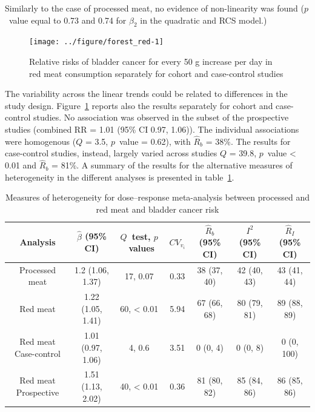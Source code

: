 \documentclass[11pt,a4paper,twoside,openany]{book}\usepackage{knitr}
\begin{document}
{\noindent Similarly to the case of processed meat, no evidence of non-linearity was found ($p$~value equal to 0.73 and 0.74 for $\beta_2$ in the quadratic and RCS model.)

\begin{knitrout}\footnotesize
{}\color{fgcolor}\begin{figure}[ht!]

{\centering \texttt{[image: ../figure/forest\_red-1]} 

}

\caption[Relative risks of bladder cancer for every 50 g increase per day in red meat consumption separately for cohort and case-control studies]{Relative risks of bladder cancer for every 50 g increase per day in red meat consumption separately for cohort and case-control studies}\label{fig:forest_red}
\end{figure}


\end{knitrout}

The variability across the linear trends could be related to differences in the study design. Figure~\ref{fig:forest_red} reports also the results separately for cohort and case-control studies. No association was observed in the subset of the prospective studies (combined RR = 1.01 (95\% CI 0.97, 1.06)). The individual associations were homogenous ($Q $ = 3.5, $p$~value = 0.62), with $\hat R_b$ = 38\%. The results for case-control studies, instead, largely varied across studies $Q $ = 39.8, $p$~value < 0.01 and $\hat R_b$ = 81\%. A summary of the results for the alternative measures of heterogeneity in the different analyses is presented in table~\ref{tab:tab_rb}.

\begin{table}[!h]

\caption{\label{tab:tab_rb}Measures of heterogeneity for dose--response meta-analysis between processed and red meat and bladder cancer risk \citep{crippa2016red}}
\centering
\fontsize{9}{11}\selectfont
\begin{tabular}[t]{ccccccc}
\toprule
Analysis & $\hat \beta$ (95\% CI) & $Q$~test, $p$~values & $CV_{v_i}$ & $\hat R_b$ (95\% CI) & $I^2$ (95\% CI) & $\hat R_I$ (95\% CI)\\
\midrule
Processed meat & 1.2 (1.06, 1.37) & 17, 0.07 & 0.33 & 38 (37, 40) & 42 (40, 43) & 43 (41, 44)\\
Red meat & 1.22 (1.05, 1.41) & 60, < 0.01 & 5.94 & 67 (66, 68) & 80 (79, 81) & 89 (88, 89)\\
Red meat Case-control & 1.01 (0.97, 1.06) & 4, 0.6 & 3.51 & 0 (0, 4) & 0 (0, 8) & 0 (0, 100)\\
Red meat Prospective & 1.51 (1.13, 2.02) & 40, < 0.01 & 0.36 & 81 (80, 82) & 85 (84, 86) & 86 (85, 86)\\
\bottomrule
\end{tabular}
\end{table}










}
\end{document}

